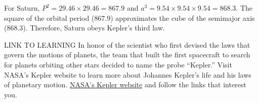 \documentclass[../../main-astronomy.tex]{subfiles}
\begin{document}
\Solution For Saturn, $P^2 = 29.46 \times 29.46 = 867.9$ and $a^3 = 9.54 \times 9.54 \times 9.54 = 868.3$. The square of the orbital period (867.9) approximates the cube of the semimajor axis (868.3). Therefore, Saturn obeys Kepler's third law.

\endsolution

\begin{gradient}{LINK TO LEARNING}
    In honor of the scientist who first devised the laws that govern the motions of planets, the team that built the first spacecraft to search for planets orbiting other stars decided to name the probe ``Kepler.'' Visit NASA's Kepler website to learn more about Johannes Kepler's life and his laws of planetary motion. \href{https://openstax.org/l/30nasakepmiss}{NASA's Kepler website} and follow the links that interest you.
\end{gradient}
\end{document}
